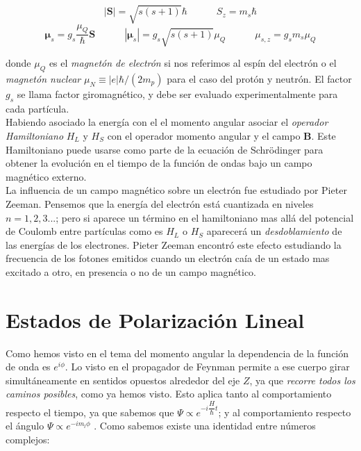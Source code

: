 \documentclass[12pt,a4paper]{article}
\numberwithin{equation}{section}
\numberwithin{figure}{section}
\newcommand{\tquad}{\quad \quad \quad}
\newcommand{\Sn}{\mathbf{S}}
\newcommand{\nmu}{\boldsymbol{\mu}}
\newcommand{\Bn}{\mathbf{B}}
\begin{document}
\begin{equation}
|\Sn| = \sqrt{s(s+1)} \hbar \tquad S_z = m_s \hbar 
\end{equation}
\begin{equation}
\nmu_s = g_s \dfrac{\mu_Q}{\hbar} \Sn  \tquad | \nmu_s | = g_s \sqrt{s(s+1)} \mu_Q \tquad \mu_{s,z} = g_s m_s \mu_Q
\end{equation}

donde $\mu_Q$ es el \textit{magnetón de electrón} si nos referimos al espín del electrón o el \textit{magnetón nuclear} $\mu_N \equiv |e| \hbar / (2 m_p)$  para el caso del protón y neutrón. El factor $g_s$ se llama factor giromagnético, y debe ser evaluado experimentalmente para cada partícula. \\

Habiendo asociado la energía con el el momento angular asociar el \textit{operador Hamiltoniano} $H_L$ y $H_S$ con el operador momento angular y el campo $\Bn$. Este Hamiltoniano puede usarse como parte de la ecuación de Schrödinger para obtener la evolución en el tiempo de la función de ondas bajo un campo magnético externo. \\

La influencia de un campo magnético sobre un electrón fue estudiado por Pieter Zeeman. Pensemos que la energía del electrón está cuantizada en niveles $n=1,2,3...$; pero si aparece un término en el hamiltoniano mas allá del potencial de Coulomb entre partículas como es $H_L$ o $H_S$ aparecerá un \textit{desdoblamiento} de las energías de los electrones. Pieter Zeeman encontró este efecto estudiando la frecuencia de los fotones emitidos cuando un electrón caía de un estado mas excitado a otro, en presencia o no de un campo magnético. 

\section{Estados de Polarización Lineal}

Como hemos visto en el tema del momento angular la dependencia de la función de onda es $e^{i \phi}$. Lo visto en el propagador de Feynman permite a ese cuerpo girar simultáneamente en sentidos opuestos alrededor del eje $Z$, ya que \textit{recorre todos los caminos posibles}, como ya hemos visto. Esto aplica tanto al comportamiento respecto el tiempo, ya que sabemos que $\Psi \varpropto e^{-i \dfrac{H}{\hbar} t}$; y al comportamiento respecto el ángulo $\Psi \varpropto e^{- i m_l \phi}$ . Como sabemos existe una identidad entre números complejos:
\end{document}
